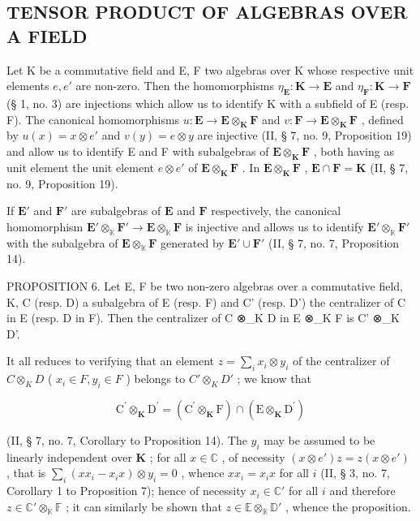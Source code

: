 \subsection{TENSOR PRODUCT OF ALGEBRAS OVER A FIELD}

Let K be a commutative field and E, F two algebras over K whose respective unit elements \(e, e'\) are non-zero. Then the homomorphisms \(\eta_{\mathbf{E}}: \mathbf{K} \to \mathbf{E}\) and \(\eta_{\mathbf{F}}: \mathbf{K} \to \mathbf{F}\) (§ 1, no. 3) are injections which allow us to identify K with a subfield of E (resp. F). The canonical homomorphisms \(u: \mathbf{E} \to \mathbf{E} \otimes_{\mathbf{K}} \mathbf{F}\) and \(v: \mathbf{F} \to \mathbf{E} \otimes_{\mathbf{K}} \mathbf{F}\) , defined by \(u(x) = x \otimes e'\) and \(v(y) = e \otimes y\) are injective (II, § 7, no. 9, Proposition 19) and allow us to identify E and F with subalgebras of \(\mathbf{E} \otimes_{\mathbf{K}} \mathbf{F}\) , both having as unit element the unit element \(e \otimes e'\) of \(\mathbf{E} \otimes_{\mathbf{K}} \mathbf{F}\) . In \(\mathbf{E} \otimes_{\mathbf{K}} \mathbf{F}\) , \(\mathbf{E} \cap \mathbf{F} = \mathbf{K}\) (II, § 7, no. 9, Proposition 19).

If \(\mathbf{E}'\) and \(\mathbf{F}'\) are subalgebras of \(\mathbf{E}\) and \(\mathbf{F}\) respectively, the canonical homomorphism \(\mathbf{E}' \otimes_{\mathbb{K}} \mathbf{F}' \to \mathbf{E} \otimes_{\mathbb{K}} \mathbf{F}\) is injective and allows us to identify \(\mathbf{E}' \otimes_{\mathbb{K}} \mathbf{F}'\) with the subalgebra of \(\mathbf{E} \otimes_{\mathbb{K}} \mathbf{F}\) generated by \(\mathbf{E}' \cup \mathbf{F}'\) (II, § 7, no. 7, Proposition 14).

PROPOSITION 6. Let E, F be two non-zero algebras over a commutative field, K, C (resp. D) a subalgebra of E (resp. F) and C' (resp. D') the centralizer of C in E (resp. D in F). Then the centralizer of C ⊗\_K D in E ⊗\_K F is C' ⊗\_K D'.

It all reduces to verifying that an element \(z = \sum_{i} x_{i} \otimes y_{i}\) of the centralizer of \(C \otimes_{K} D\) ( \(x_{i} \in F, y_{i} \in F\) ) belongs to \(C' \otimes_{K} D'\) ; we know that

\[
\mathrm{C} ^ {\prime} \otimes_ {\mathbf {K}} \mathrm{D} ^ {\prime} = (\mathrm{C} ^ {\prime} \otimes_ {\mathbf {K}} \mathrm{F}) \cap (\mathrm{E} \otimes_ {\mathbf {K}} \mathrm{D} ^ {\prime})
\]

(II, § 7, no. 7, Corollary to Proposition 14). The \(y_{i}\) may be assumed to be linearly independent over \(\mathbf{K}\) ; for all \(x \in \mathbb{C}\) , of necessity \((x \otimes e')z = z(x \otimes e')\) , that is \(\sum_{i} (xx_{i} - x_{i}x) \otimes y_{i} = 0\) , whence \(xx_{i} = x_{i}x\) for all \(i\) (II, § 3, no. 7, Corollary 1 to Proposition 7); hence of necessity \(x_{i} \in \mathbb{C}'\) for all \(i\) and therefore \(z \in \mathbb{C}' \otimes_{\mathbb{K}} \mathbb{F}\) ; it can similarly be shown that \(z \in \mathbb{E} \otimes_{\mathbb{K}} \mathbb{D}'\) , whence the proposition.

